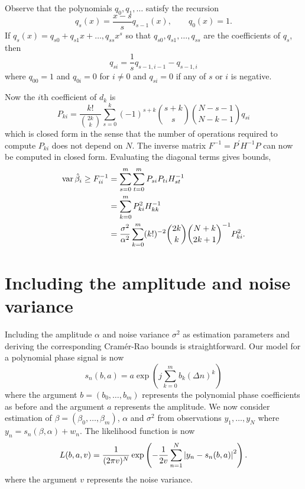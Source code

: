 \documentclass[journal,10pt]{IEEEtran}
\begin{document}
Observe that the polynomials $q_0,q_1,\dots$ satisfy the recursion
\[
q_s(x) = \frac{x-s}{s} q_{s-1}(x), \qquad q_{0}(x) = 1.
\]
If $q_s(x) = q_{s0} + q_{s1}x + \dots, q_{ss}x^s$ so that $q_{s0},q_{s1},\dots,q_{ss}$ are the coefficients of $q_{s}$, then
\[
q_{si} = \frac{1}{s}q_{s-1,i-1} - q_{s-1,i}
\]
where $q_{00}=1$ and $q_{0i}=0$ for $i \neq 0$ and $q_{si} = 0$ if any of $s$ or $i$ is negative.

Now the $i$th coefficient of $d_k$ is
\[
P_{ki} = \frac{k!}{\binom{2k}{k}}\sum_{s=0}^k{(-1)^{s+k}\binom{s+k}{s}\binom{N-s-1}{N-k-1}q_{si}}
\]  
which is closed form in the sense that the number of operations required to compute $P_{ki}$ does not depend on $N$.  The inverse matrix $F^{-1} = P^\prime H^{-1} P$ can now be computed in closed form.  Evaluating the diagonal terms gives bounds,
\begin{align*}
\operatorname{var} \hat{\beta}_i \geq F_{ii}^{-1} &=  \sum_{s=0}^{m}\sum_{t=0}^{m} P_{si} P_{ti}  H_{st}^{-1} \\
&=  \sum_{k=0}^{m} P_{ki}^2  H_{kk}^{-1} \\
&= \frac{\sigma^2}{\alpha^2} \sum_{k=0}^{m} (k!)^{-2} \binom{2k}{k} \binom{N+k}{2k+1}^{-1} P_{ki}^2.
\end{align*}
 

 

\section{Including the amplitude and noise variance}\label{sec:including-amplitude}

Including the amplitude $\alpha$ and noise variance $\sigma^2$ as estimation parameters and deriving the corresponding Cram\'{e}r-Rao bounds is straightforward.  Our model for a polynomial phase signal is now
\[
s_n(b,a) = a \exp\left( j \sum_{k = 0}^{m}{b_k (\Delta n)^k}\right)
\]
where the argument $b=(b_0, \dots, b_m)$ represents the polynomial phase coefficients as before and the argument $a$ represents the amplitude.  We now consider estimation of $\beta = (\beta_0, \dots, \beta_m)$, $\alpha$ and $\sigma^2$  from observations $y_1, \dots, y_N$ where $y_n = s_n(\beta,\alpha) + w_n$.  The likelihood function is now
\[
L(b,a,v) = \frac{1}{(2 \pi v )^N} \exp\left( - \frac{1}{2 v } \sum_{n=1}^N {\left| y_n -  s_n(b,a)  \right|}^2 \right).
\]
where the argument $v$ represents the noise variance.
\end{document}
